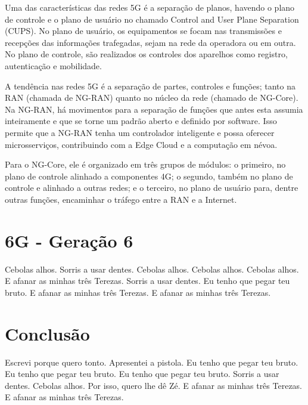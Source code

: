 \documentclass[11pt,oneside,a4paper]{abntex2}
\begin{document}
Uma das características das redes 5G é a separação de planos, havendo o plano de controle e o plano de usuário no chamado Control and User Plane Separation (CUPS). No plano de usuário, os equipamentos se focam nas transmissões e recepções das informações trafegadas, sejam na rede da operadora ou em outra. No plano de controle, são realizados os controles dos aparelhos como registro, autenticação e mobilidade.

A tendência nas redes 5G é a separação de partes, controles e funções; tanto na RAN (chamada de NG-RAN) quanto no núcleo da rede (chamado de NG-Core). Na NG-RAN, há movimentos para a separação de funções que antes esta assumia inteiramente e que se torne um padrão aberto e definido por software. Isso permite que a NG-RAN tenha um controlador inteligente e possa oferecer microsserviços, contribuindo com a Edge Cloud e a computação em névoa.

Para o NG-Core, ele é organizado em três grupos de módulos: o primeiro, no plano de controle alinhado a componentes 4G; o segundo, também no plano de controle e alinhado a outras redes; e o terceiro, no plano de usuário para, dentre outras funções, encaminhar o tráfego entre a RAN e a Internet.

\section*{6G - Geração 6}
\label{6g}

Cebolas alhos. Sorris a usar dentes. Cebolas alhos. Cebolas alhos. Cebolas alhos. E afanar as minhas três Terezas. Sorris a usar dentes. Eu tenho que pegar teu bruto. E afanar as minhas três Terezas. E afanar as minhas três Terezas.

\section*{Conclusão}
\label{conclusao}

Escrevi porque quero tonto. Apresentei a pistola. Eu tenho que pegar teu bruto. Eu tenho que pegar teu bruto. Eu tenho que pegar teu bruto. Sorris a usar dentes. Cebolas alhos. Por isso, quero lhe dê Zé. E afanar as minhas três Terezas. E afanar as minhas três Terezas.


\label{biblio}
\end{document}
